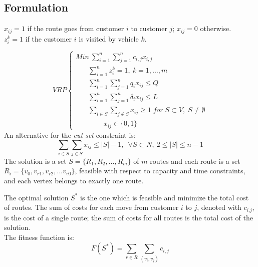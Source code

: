 \documentclass[twoside]{article}
\begin{document}
\begin{multicols}{2}
\clearpage
\section{Formulation}
$x_{ij}=1$ if the route goes from customer $i$ to customer $j$; $x_{ij}=0$ otherwise.\\
$z^{k}_{i}=1$ if the customer $i$ is visited by vehicle $k$.

\begin{equation*}
	VRP
	\begin{cases}
		\displaystyle Min\ \sum_{i=1}^{n}\sum_{j=1}^{n}c_{i,j}x_{i,j} \\
		\ \ \ \ \ \ \ \ \displaystyle\sum_{i=1}^{n}z^{k}_{i}=1,\ k=1,\dots,m \\
		\ \ \ \ \ \ \ \ \displaystyle\sum_{i=1}^{n}\sum_{j=1}^{n}q_{i}x_{ij} \le Q \\
		\ \ \ \ \ \ \ \ \displaystyle\sum_{i=1}^{n}\sum_{j=1}^{n}\delta_{i}x_{ij} \le L \\
		\ \ \ \ \ \ \ \ \displaystyle\sum_{i \in S} \sum_{j \notin S}x_{ij} \ge 1\;for\;S \subset V,\; S\ne \emptyset \\
		\ \ \ \ \ \ \ \ \ \ \ \ \ \ \ \ \ \ x_{ij} \in \{0,1\}
	\end{cases}
\end{equation*}
An alternative for the \textit{cut-set} constraint is:
\begin{equation*}
	\displaystyle\sum_{i\in S}\sum_{j\in S}x_{ij}\le \lvert S\rvert-1,\ \; \forall S\subset N,\ 2\le\lvert S\rvert\le n-1
\end{equation*}
The solution is a set $S=\{R_{1},R_{2},...,R_{m}\}$ of $m$ routes and each route is a set $R_{i}=\{v_{0},v_{r1},v_{r2},...v_{v0}\}$, feasible with respect to capacity and time constraints, and each vertex belongs to exactly one route.

The optimal solution $S^{*}$ is the one which is feasible and minimize the total cost of routes.
The sum of costs for each move from customer $i$ to $j$, denoted with $c_{i.j}$, is the cost of a single route; the sum of costs for all routes is the total cost of the solution.\\
The fitness function is:
\begin{equation}
F(S^{*}) = \sum_{r\in R} \sum_{(v_{i},v_{j})} c_{i,j} \label{eq:objfun}
\end{equation}
	


\end{multicols}
\end{document}
